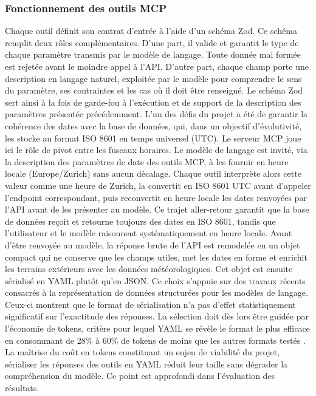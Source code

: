 \documentclass[12pt]{article}
\begin{document}
\subsubsection{Fonctionnement des outils MCP}
Chaque outil définit son contrat d'entrée à l'aide d'un schéma Zod. Ce schéma remplit deux rôles complémentaires. D'une part, il valide et garantit le type de chaque paramètre transmis par le modèle de langage. Toute donnée mal formée est rejetée avant le moindre appel à l'API. D'autre part, chaque champ porte une description en langage naturel, exploitée par le modèle pour comprendre le sens du paramètre, ses contraintes et les cas où il doit être renseigné. Le schéma Zod sert ainsi à la fois de garde-fou à l'exécution et de support de la description des paramètres présentée précédemment.
\newline\newline
L'un des défis du projet a été de garantir la cohérence des dates avec la base de données, qui, dans un objectif d'évolutivité, les stocke au format ISO 8601 en temps universel (UTC). Le serveur MCP joue ici le rôle de pivot entre les fuseaux horaires. Le modèle de langage est invité, via la description des paramètres de date des outils MCP, à les fournir en heure locale (Europe/Zurich) sans aucun décalage. Chaque outil interprète alors cette valeur comme une heure de Zurich, la convertit en ISO 8601 UTC avant d'appeler l'endpoint correspondant, puis reconvertit en heure locale les dates renvoyées par l'API avant de les présenter au modèle. Ce trajet aller-retour garantit que la base de données reçoit et retourne toujours des dates en ISO 8601, tandis que l'utilisateur et le modèle raisonnent systématiquement en heure locale.
\newline\newline
Avant d'être renvoyée au modèle, la réponse brute de l'API est remodelée en un objet compact qui ne conserve que les champs utiles, met les dates en forme et enrichit les terrains extérieurs avec les données météorologiques. Cet objet est ensuite sérialisé en YAML plutôt qu'en JSON. Ce choix s'appuie sur des travaux récents consacrés à la représentation de données structurées pour les modèles de langage. Ceux-ci montrent que le format de sérialisation n'a pas d'effet statistiquement significatif sur l'exactitude des réponses. La sélection doit dès lors être guidée par l'économie de tokens, critère pour lequel YAML se révèle le format le plus efficace en consommant de 28\% à 60\% de tokens de moins que les autres formats testés \parencite[p~7]{mcmillan_structured_2026}. La maîtrise du coût en tokens constituant un enjeu de viabilité du projet, sérialiser les réponses des outils en YAML réduit leur taille sans dégrader la compréhension du modèle. Ce point est approfondi dans l'évaluation des résultats.
\end{document}
